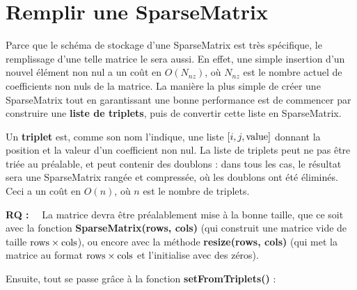 \documentclass[11pt]{article}
\begin{document}
\vspace{5 mm}

\section{Remplir une SparseMatrix}

\noindent
Parce que le schéma de stockage d'une SparseMatrix est très spécifique, le remplissage d'une telle matrice le sera aussi. En effet, une simple insertion d'un nouvel élément non nul a un coût en $O(N_{nz})$, où $N_{nz}$ est le nombre actuel de coefficients non nuls de la matrice. La manière la plus simple de créer une SparseMatrix tout en garantissant une bonne performance est de commencer par construire une \textbf{liste de triplets}, puis de convertir cette liste en SparseMatrix.

\vspace{5 mm}

\noindent
Un \textbf{triplet} est, comme son nom l'indique, une liste $[i,j,{\rm value}]$ donnant la position et la valeur d'un coefficient non nul. La liste de triplets peut ne pas être triée au préalable, et peut contenir des doublons : dans tous les cas, le résultat sera une SparseMatrix rangée et compressée, où les doublons ont été éliminés. Ceci a un coût en $O(n)$, où $n$ est le nombre de triplets.

\vspace{5 mm}

\noindent
\textbf{RQ :}~~ La matrice devra être préalablement mise à la bonne taille, que ce soit avec la fonction \textbf{SparseMatrix(rows, cols)} (qui construit une matrice vide de taille ${\rm rows} \times {\rm cols}$), ou encore avec la méthode \textbf{resize(rows, cols)} (qui met la matrice au format ${\rm rows} \times {\rm cols}$ et l'initialise avec des zéros).

\vspace{5 mm}

\noindent
Ensuite, tout se passe grâce à la fonction \textbf{setFromTriplets()} :

\vspace{5 mm}

\begin{center}
\end{center}
\end{document}
